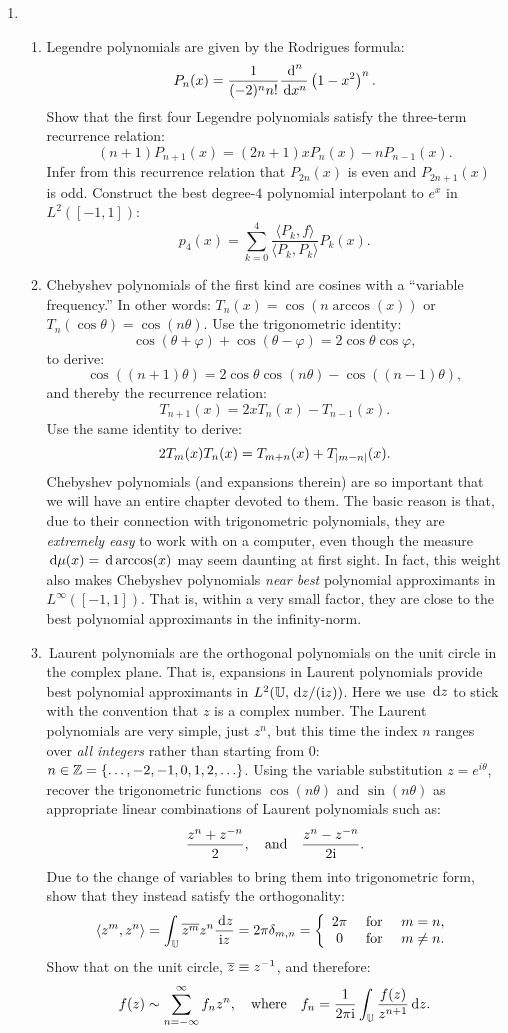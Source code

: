 \documentclass[11pt,letterpaper]{article}
\begin{document}
\begin{enumerate}
\item \begin{enumerate}
\item Legendre polynomials are given by the Rodrigues formula:
\[
P_n(x) = \dfrac{1}{(-2)^nn!}\dfrac{{\rm\,d}^n}{{\rm\,d} x^n}\left(1-x^2\right)^n.
\]
Show that the first four Legendre polynomials satisfy the three-term recurrence relation:
\[
(n+1)P_{n+1}(x) = (2n+1)xP_n(x) - nP_{n-1}(x).
\]
Infer from this recurrence relation that $P_{2n}(x)$ is even and $P_{2n+1}(x)$ is odd. Construct the best degree-$4$ polynomial interpolant to $e^x$ in $L^2([-1,1])$:
\[
p_4(x) = \sum_{k=0}^4 \dfrac{\langle P_k,f\rangle}{\langle P_k,P_k\rangle}P_k(x).
\]
\item Chebyshev polynomials of the first kind are cosines with a ``variable frequency.'' In other words: $T_n(x) = \cos(n\arccos(x))$ or $T_n(\cos\theta) = \cos(n\theta)$. Use the trigonometric identity:
\[
\cos(\theta+\varphi) + \cos(\theta-\varphi) = 2\cos\theta \cos\varphi,
\]
to derive:
\[
\cos((n+1)\theta) = 2\cos\theta \cos(n\theta) - \cos((n-1)\theta),
\]
and thereby the recurrence relation:
\[
T_{n+1}(x) = 2xT_n(x) - T_{n-1}(x).
\]
Use the same identity to derive:
\[
2T_m(x)T_n(x) = T_{m+n}(x) + T_{\left|{m-n}\right|}(x).
\]
Chebyshev polynomials (and expansions therein) are so important that we will have an entire chapter devoted to them. The basic reason is that, due to their connection with trigonometric polynomials, they are {\em extremely easy} to work with on a computer, even though the measure ${\rm\,d}\mu(x) = {\rm\,d} \arccos(x)$ may seem daunting at first sight. In fact, this weight also makes Chebyshev polynomials {\em near best} polynomial approximants in $L^\infty([-1,1])$. That is, within a very small factor, they are close to the best polynomial approximants in the infinity-norm.
\item\, Laurent polynomials are the orthogonal polynomials on the unit circle in the complex plane. That is, expansions in Laurent polynomials provide best polynomial approximants in $L^2(\mathbb{U},{\rm\,d} z/({\rm i} z))$. Here we use ${\rm\,d} z$ to stick with the convention that $z$ is a complex number. The Laurent polynomials are very simple, just $z^n$, but this time the index $n$ ranges over {\em all integers} rather than starting from $0$: $n\in\mathbb{Z} = \{\ldots,-2,-1,0,1,2,\ldots\}$. Using the variable substitution $z = e^{i\theta}$, recover the trigonometric functions $\cos(n\theta)$ and $\sin(n\theta)$ as appropriate linear combinations of Laurent polynomials such as:
\[
\dfrac{z^{n}+z^{-n}}{2},\quad{\rm and}\quad\dfrac{z^{n}-z^{-n}}{2{\rm i}}.
\]
Due to the change of variables to bring them into trigonometric form, show that they instead satisfy the orthogonality:
\[
\langle z^m, z^n\rangle = \int_{\mathbb{U}} \overline{z^m}z^n\frac{{\rm\,d} z}{{\rm i} z} = 2\pi\delta_{m,n} = \left\{\begin{array}{ccc} 2\pi & \hbox{ for } & m = n,\\ 0 & \hbox{ for } & m \ne n.\end{array}\right.
\]
Show that on the unit circle, $\overline{z} \equiv z^{-1}$, and therefore:
\[
f(z) \sim \sum_{n=-\infty}^\infty f_n z^n,\quad{\rm where}\quad f_n = \dfrac{1}{2\pi{\rm i}}\int_{\mathbb{U}} \dfrac{f(z)}{z^{n+1}}{\rm\,d} z.
\]
\end{enumerate}


\end{enumerate}
\end{document}
